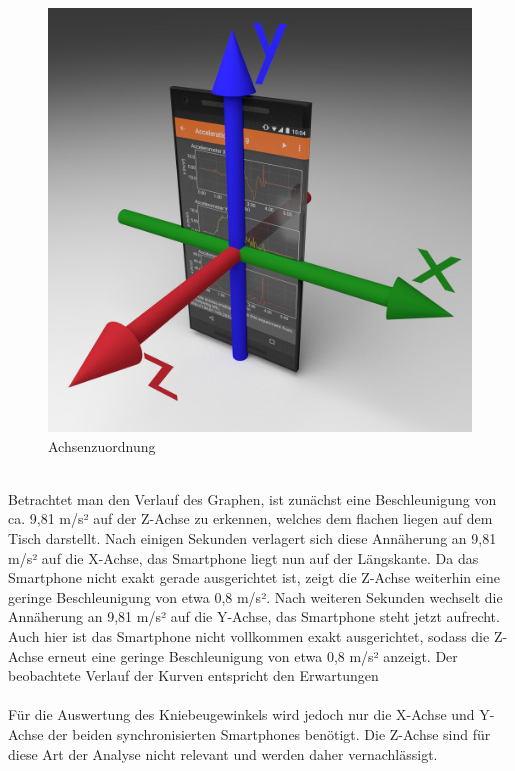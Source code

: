 \begin{figure}[ht]\centering
\includegraphics[width=0.35\linewidth]{images/Achsenzuordnung.jpeg}
\caption{Achsenzuordnung \cite{Phyphox}}
\label{fig:Achsenzuordnung}
\end{figure}
\\
\noindent Betrachtet man den Verlauf des Graphen, ist zunächst eine Beschleunigung von ca. 9,81 m/s² auf der Z-Achse zu erkennen, welches dem flachen liegen auf dem Tisch darstellt. Nach einigen Sekunden verlagert sich diese Annäherung an 9,81 m/s² auf die X-Achse, das Smartphone liegt nun auf der Längskante. Da das Smartphone nicht exakt gerade ausgerichtet ist, zeigt die Z-Achse weiterhin eine geringe Beschleunigung von etwa 0,8 m/s². Nach weiteren Sekunden wechselt die Annäherung an 9,81 m/s² auf die Y-Achse, das Smartphone steht jetzt aufrecht. Auch hier ist das Smartphone nicht vollkommen exakt ausgerichtet, sodass die Z-Achse erneut eine geringe Beschleunigung von etwa 0,8 m/s² anzeigt. Der beobachtete Verlauf der Kurven entspricht den Erwartungen
\\
\\
\noindent Für die Auswertung des Kniebeugewinkels wird jedoch nur die X-Achse und Y-Achse der beiden synchronisierten Smartphones benötigt. Die Z-Achse sind für diese Art der Analyse nicht relevant und werden daher vernachlässigt.